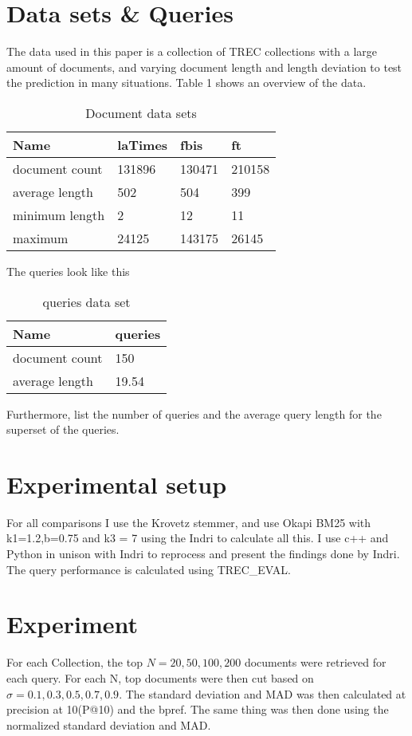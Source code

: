 \documentclass{sig-alternate}
\begin{document}
\section{Data sets \& Queries}
The data used in this paper is a collection of TREC collections with a large amount of documents, and varying document length and length deviation to test the prediction in many situations. Table 1 shows an overview of the data.  
\begin{table}[h!]
\centering
\caption{Document data sets}
\label{my-label}
\begin{tabular}{|l|l|l|l|}
\hline
Name           & laTimes & fbis   & ft     \\ \hline
document count & 131896  & 130471 & 210158 \\ \hline
average length & 502     & 504    & 399    \\ \hline
minimum length & 2       & 12     & 11     \\ \hline
maximum        & 24125   & 143175 & 26145  \\ \hline
\end{tabular}
\end{table}

The queries look like this
\begin{table}[h!]
\centering
\caption{queries data set}
\label{my-label}
\begin{tabular}{|l|l|}
\hline
Name           & queries \\ \hline
document count & 150     \\ \hline
average length & 19.54   \\ \hline
\end{tabular}
\end{table}

Furthermore, list the number of queries and the average query length for the superset of the queries.

\section{Experimental setup}
For all comparisons I use the Krovetz stemmer, and use Okapi BM25 with k1=1.2,b=0.75 and k3 = 7 using the Indri to calculate all this. I use c++ and Python in unison with Indri to reprocess and present the findings done by Indri. The query performance is calculated using TREC\_EVAL.

\section{Experiment}
For each Collection, the top $N = {20,50,100,200}$ documents were retrieved for each query. For each N, top documents were then cut based on $\sigma={0.1,0.3,0.5,0.7,0.9}$. The standard deviation and MAD was then calculated at precision at 10(P@10) and the bpref. The same thing was then done using the normalized standard deviation and MAD.
\end{document}
